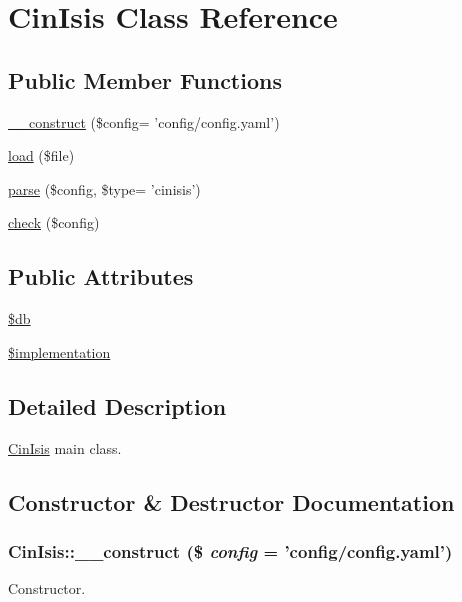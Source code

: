 \hypertarget{classCinIsis}{
\section{CinIsis Class Reference}
\label{classCinIsis}
}
\subsection*{Public Member Functions}
\begin{DoxyCompactItemize}
\item 
\hyperlink{classCinIsis_a0f8b918be2f0f1d2c68955b3295034fe}{\_\-\_\-construct} (\$config= 'config/config.yaml')
\item 
\hyperlink{classCinIsis_a831607c2fe9ffac63be8de42e1c9dbae}{load} (\$file)
\item 
\hyperlink{classCinIsis_afa9cbac9e165ebed194b24487344d2fb}{parse} (\$config, \$type= 'cinisis')
\item 
\hyperlink{classCinIsis_acd7e7486428fac5a0a85ad46b0486820}{check} (\$config)
\end{DoxyCompactItemize}
\subsection*{Public Attributes}
\begin{DoxyCompactItemize}
\item 
\hyperlink{classCinIsis_ada0e16c222436f776f040e0fe1a25184}{\$db}
\item 
\hyperlink{classCinIsis_aea1086b32d45308f6875f6ed0a6db2fc}{\$implementation}
\end{DoxyCompactItemize}


\subsection{Detailed Description}
\hyperlink{classCinIsis}{CinIsis} main class. 

\subsection{Constructor \& Destructor Documentation}
\hypertarget{classCinIsis_a0f8b918be2f0f1d2c68955b3295034fe}{
\subsubsection[{\_\-\_\-construct}]{\setlength{\rightskip}{0pt plus 5cm}CinIsis::\_\-\_\-construct (\$ {\em config} = {\ttfamily 'config/config.yaml'})}}
\label{classCinIsis_a0f8b918be2f0f1d2c68955b3295034fe}
Constructor.


